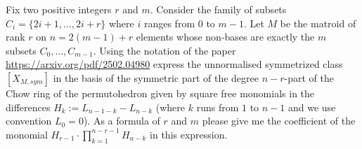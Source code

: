 Fix two positive integers $r$ and $m$. Consider the family of subsets $C_i=\{2i+1,...,2i+r\}$ where $i$ ranges from $0$ to $m-1$. Let $M$ be the matroid of rank $r$ on $n=2(m-1)+r$ elements whose non-bases are exactly the $m$ subsets $C_0,...,C_{m-1}$. Using the notation of the paper \url{https://arxiv.org/pdf/2502.04980} express the unnormalised symmetrized class $[X_{M,sym}]$ in the basis of the symmetric part of the degree $n-r$-part of the Chow ring of the permutohedron given by square free monomials in the differences $H_k:=L_{n-1-k} - L_{n-k}$ (where $k$ runs from $1$ to $n-1$ and we use convention $L_0=0$). As a formula of $r$ and $m$ please give me the coefficient of the monomial $H_{r-1}\cdot \prod_{k=1}^{n-r-1}H_{n-k}$ in this expression.
